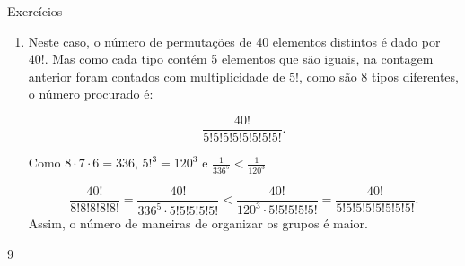 \begin{answer}{Exercícios}
{\begin{enumerate}
\item Neste caso, o número de permutações de 40 elementos distintos é dado por $40!$. Mas como cada tipo contém 5 elementos que são iguais, na contagem anterior foram contados com multiplicidade de $5!$, como são 8 tipos diferentes, o número procurado é:

$$\dfrac{40!}{5!5!5!5!5!5!5!5!}.$$

Como $8\cdot 7 \cdot 6 = 336$, $5!^3=120^3$ e  $\frac{1}{336^5}< \frac{1}{ 120^3} $  

$$\dfrac{40!}{8!8!8!8!8!} = \dfrac{40!}{336^5 \cdot 5!5!5!5!5!} <  \dfrac{40!}{120^3 \cdot 5!5!5!5!5!}= \dfrac{40!}{5!5!5!5!5!5!5!5!}.$$ Assim, o número de maneiras de organizar os grupos é maior.
\end{enumerate}
}{9}
\end{answer}

